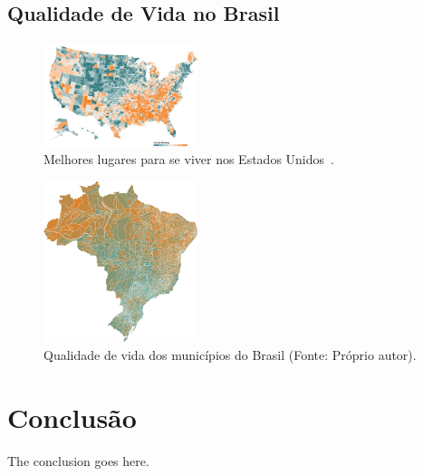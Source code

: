\documentclass[conference]{IEEEtran}
\begin{document}
\subsection{Qualidade de Vida no Brasil}

\begin{figure}[!ht]
\centering
\includegraphics[width=0.40\textwidth]{usa.png}
\caption{Melhores lugares para se viver nos Estados Unidos~\cite{nytimes}.}
\label{img:lugares-viver-usa}
\end{figure}

\begin{figure}[!ht]
\centering
\includegraphics[width=0.40\textwidth]{qualidade-de-vida.png}
\caption{Qualidade de vida dos municípios do Brasil (Fonte: Próprio autor).}
\label{img:qualidade-de-vida-brasil}
\end{figure}

\section{Conclusão}
\label{section:conclusao}
The conclusion goes here.
\end{document}
